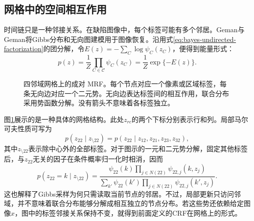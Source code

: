 \subsection{网格中的空间相互作用}
时间链只是一种邻接关系。在缺陷图像中，每个标签可能有多个邻居。Geman与Geman将Gibbs分布和无向图建模用于图像恢复\cite{geman1984mrf}。沿用式\eqref{eq:bayes-undirected-factorization}的团分解，令$E(z)=-\sum_C\log\psi_C(z_C)$，便得到能量形式：
\begin{equation}
 p(z)=\frac{1}{Z}\prod_{C\in\mathcal C}\psi_C(z_C)
 =\frac{1}{Z}\exp\{-E(z)\}.
\end{equation}
\begin{figure}[htbp]
\centering
{}
\caption{四邻域网格上的成对 MRF。每个节点对应一个像素或区域标签，每条无向边对应一个二元势。无向边表达标签间的相互作用，联合分布采用势函数分解。没有箭头不意味着各标签独立。}
\label{fig:bayes-mrf-structure}
\end{figure}
图\ref{fig:bayes-mrf-structure}展示的是一种具体的网格结构。此处$z_{rc}$的两个下标分别表示行和列。局部马尔可夫性质可写为
\begin{equation}
 p(z_{22}\mid z_{\setminus 22})
 =p(z_{22}\mid z_{12},z_{21},z_{23},z_{32}),
\end{equation}
其中$z_{\setminus 22}$表示除中心外的全部标签。对于图示的一元和二元势分解，固定其他标签后，与$z_{22}$无关的因子在条件概率归一化时相消，因而
\begin{equation}
 p(z_{22}=k\mid z_{\setminus 22})
 =\frac{\psi_{22}(k)\prod_{j\in N(22)}\psi_{22,j}(k,z_j)}
 {\sum_{k'}\psi_{22}(k')\prod_{j\in N(22)}\psi_{22,j}(k',z_j)}.
\end{equation}
这也解释了Gibbs采样为何只需读取当前节点的邻居。不过，局部更新只访问邻域，并不意味着联合分布能够分解成相互独立的节点分布。若这些势还依赖给定图像$x$，图中的标签邻接关系保持不变，就得到前面定义的CRF在网格上的形式。

